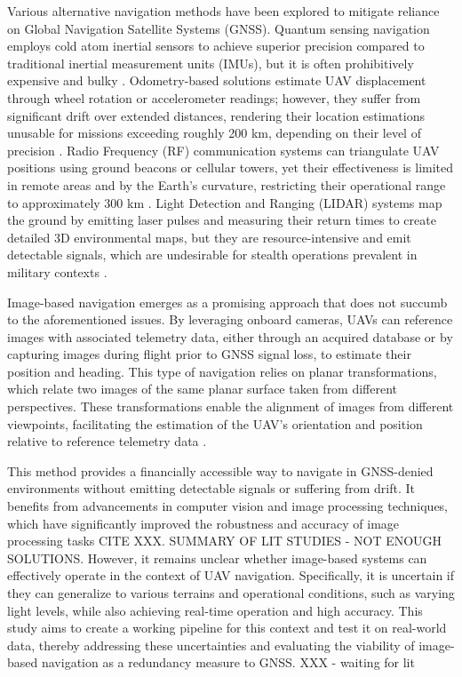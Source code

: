 Various alternative navigation methods have been explored to mitigate reliance on Global Navigation Satellite Systems (GNSS). Quantum sensing navigation employs cold atom inertial sensors to achieve superior precision compared to traditional inertial measurement units (IMUs), but it is often prohibitively expensive and bulky \cite{wright2022cold}. Odometry-based solutions estimate UAV displacement through wheel rotation or accelerometer readings; however, they suffer from significant drift over extended distances, rendering their location estimations unusable for missions exceeding roughly 200 km, depending on their level of precision \cite{Zhuang2023}. Radio Frequency (RF) communication systems can triangulate UAV positions using ground beacons or cellular towers, yet their effectiveness is limited in remote areas and by the Earth's curvature, restricting their operational range to approximately 300 km \cite{brewer_line_2024}. Light Detection and Ranging (LIDAR) systems map the ground by emitting laser pulses and measuring their return times to create detailed 3D environmental maps, but they are resource-intensive and emit detectable signals, which are undesirable for stealth operations prevalent in military contexts \cite{scoutaerial2024lidar}.

Image-based navigation emerges as a promising approach that does not succumb to the aforementioned issues. By leveraging onboard cameras, UAVs can reference images with associated telemetry data, either through an acquired database or by capturing images during flight prior to GNSS signal loss, to estimate their position and heading. This type of navigation relies on planar transformations, which relate two images of the same planar surface taken from different perspectives. These transformations enable the alignment of images from different viewpoints, facilitating the estimation of the UAV's orientation and position relative to reference telemetry data \cite{arafat2023vision}.

This method provides a financially accessible way to navigate in GNSS-denied environments without emitting detectable signals or suffering from drift. It benefits from advancements in computer vision and image processing techniques, which have significantly improved the robustness and accuracy of image processing tasks {CITE XXX}. SUMMARY OF LIT STUDIES - NOT ENOUGH SOLUTIONS. 
However, it remains unclear whether image-based systems can effectively operate in the context of UAV navigation. Specifically, it is uncertain if they can generalize to various terrains and operational conditions, such as varying light levels, while also achieving real-time operation and high accuracy. This study aims to create a working pipeline for this context and test it on real-world data, thereby addressing these uncertainties and evaluating the viability of image-based navigation as a redundancy measure to GNSS.
XXX - waiting for lit

